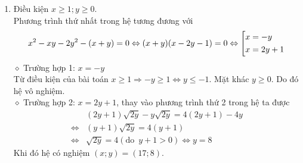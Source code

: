 \begin{ex}
{\begin{enumerate}
  	\item Điều kiện $x\ge 1;y\ge 0$.\\
  	Phương trình thứ nhất trong hệ tương đương với 
  	$$x^2-xy-2y^2-(x+y)=0\Leftrightarrow (x+y)(x-2y-1)=0\Leftrightarrow \left[\begin{aligned}&x=-y\\&x=2y+1\end{aligned}\right.$$
  	$\diamond$  Trường hợp 1: $x=-y$ \\
  	Từ điều kiện của bài toán $x\ge 1 \Rightarrow -y \ge 1 \Leftrightarrow y \le -1$. Mặt khác $y\ge 0$. Do đó hệ vô nghiệm.\\
  	$\diamond$  Trường hợp 2: $x=2y+1$, thay vào phương trình thứ 2 trong hệ ta được
  	\begin{align*}
  	&(2y+1)\sqrt{2y}-y\sqrt{2y}=4(2y+1)-4y\\
  	\Leftrightarrow & (y+1)\sqrt{2y}=4(y+1)\\
  	\Leftrightarrow & \sqrt{2y}=4(\text{do}\,\,\,y+1> 0) \Leftrightarrow y=8
  	\end{align*}
  	Khi đó hệ có nghiệm $(x;y)=(17;8).$
    \end{enumerate}
    }
\end{ex}

